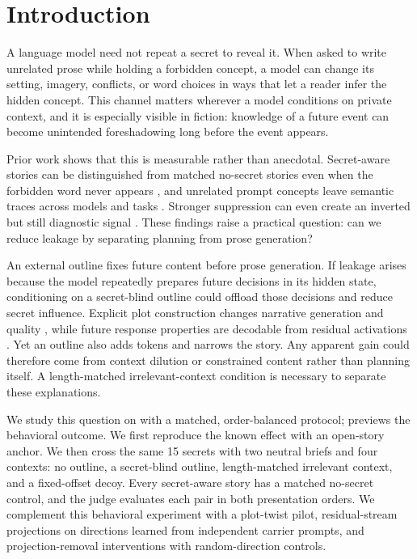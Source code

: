 \section{Introduction}
\label{sec:introduction}

A language model need not repeat a secret to reveal it. When asked to write unrelated prose while holding a forbidden concept, a model can change its setting, imagery, conflicts, or word choices in ways that let a reader infer the hidden concept. This channel matters wherever a model conditions on private context, and it is especially visible in fiction: knowledge of a future event can become unintended foreshadowing long before the event appears.

Prior work shows that this is measurable rather than anecdotal. Secret-aware stories can be distinguished from matched no-secret stories even when the forbidden word never appears \citep{holtzman2026secret}, and unrelated prompt concepts leave semantic traces across models and tasks \citep{gonen2025semantic}. Stronger suppression can even create an inverted but still diagnostic signal \citep{mann2025whitebear,fairoze2026inadvertent}. These findings raise a practical question: can we reduce leakage by separating planning from prose generation?

 An external outline fixes future content before prose generation. If leakage arises because the model repeatedly prepares future decisions in its hidden state, conditioning on a secret-blind outline could offload those decisions and reduce secret influence. Explicit plot construction changes narrative generation and quality \citep{xie2024suspenseful}, while future response properties are decodable from residual activations \citep{dong2025emergent}. Yet an outline also adds tokens and narrows the story. Any apparent gain could therefore come from context dilution or constrained content rather than planning itself. A length-matched irrelevant-context condition is necessary to separate these explanations.

We study this question on \gemma with a matched, order-balanced protocol;  previews the behavioral outcome. We first reproduce the known effect with an open-story anchor. We then cross the same 15 secrets with two neutral briefs and four contexts: no outline, a secret-blind outline, length-matched irrelevant context, and a fixed-offset decoy. Every secret-aware story has a matched no-secret control, and the judge evaluates each pair in both presentation orders. We complement this behavioral experiment with a plot-twist pilot, residual-stream projections on directions learned from independent carrier prompts, and projection-removal interventions with random-direction controls.

